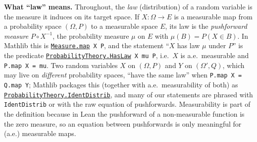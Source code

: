 \medskip\noindent\textbf{What ``law'' means.}
Throughout, the \emph{law} (distribution) of a random variable is the measure it induces on its target space. If $X:\Omega\to E$ is a measurable map from a probability space $(\Omega,P)$ to a measurable space $E$, its law is the
\emph{pushforward measure} $P\circ X^{-1}$, the probability measure $\mu$ on $E$ with $\mu(B)=P(X\in B)$. In Mathlib this is
\href{https://leanprover-community.github.io/mathlib4_docs/Mathlib/MeasureTheory/Measure/Map.html#MeasureTheory.Measure.map}{\texttt{Measure.map}}\texttt{ X P}, and the statement ``$X$ has law $\mu$ under $P$'' is the predicate
\href{https://leanprover-community.github.io/mathlib4_docs/Mathlib/Probability/HasLaw.html#ProbabilityTheory.HasLaw}{\texttt{ProbabilityTheory.HasLaw}}\texttt{ X mu P}, i.e.\ $X$ is a.e.\ measurable and \texttt{P.map X = mu}.
Two random variables $X$ on $(\Omega,P)$ and $Y$ on $(\Omega',Q)$, which may live on \emph{different} probability spaces, ``have the same law'' when \texttt{P.map X = Q.map Y}; Mathlib packages this (together with a.e.\ measurability of both) as
\href{https://leanprover-community.github.io/mathlib4_docs/Mathlib/Probability/IdentDistrib.html#ProbabilityTheory.IdentDistrib}{\texttt{ProbabilityTheory.IdentDistrib}}, and many of our statements are phrased with \texttt{IdentDistrib} or with the raw equation of pushforwards.
Measurability is part of the definition because in Lean the pushforward of a non-measurable function is the zero measure, so an equation between pushforwards is only meaningful for (a.e.) measurable maps.

